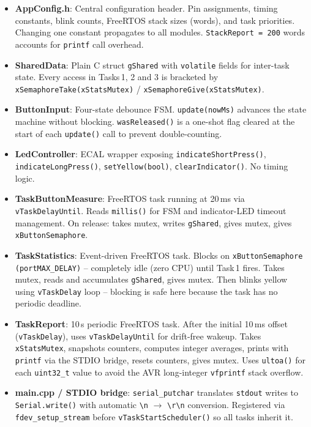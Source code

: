\documentclass[12pt]{article}
\begin{document}
\begin{itemize}
    \item \textbf{AppConfig.h}: Central configuration header. Pin assignments, timing constants, blink counts, FreeRTOS stack sizes (words), and task priorities. Changing one constant propagates to all modules. \texttt{StackReport = 200} words accounts for \texttt{printf} call overhead.

    \item \textbf{SharedData}: Plain C struct \texttt{gShared} with \texttt{volatile} fields for inter-task state. Every access in Tasks\,1, 2 and 3 is bracketed by \texttt{xSemaphoreTake(xStatsMutex)} / \texttt{xSemaphoreGive(xStatsMutex)}.

    \item \textbf{ButtonInput}: Four-state debounce FSM. \texttt{update(nowMs)} advances the state machine without blocking. \texttt{wasReleased()} is a one-shot flag cleared at the start of each \texttt{update()} call to prevent double-counting.

    \item \textbf{LedController}: ECAL wrapper exposing \texttt{indicateShortPress()}, \texttt{indicateLongPress()}, \texttt{setYellow(bool)}, \texttt{clearIndicator()}. No timing logic.

    \item \textbf{TaskButtonMeasure}: FreeRTOS task running at 20\,ms via \texttt{vTaskDelayUntil}. Reads \texttt{millis()} for FSM and indicator-LED timeout management. On release: takes mutex, writes \texttt{gShared}, gives mutex, gives \texttt{xButtonSemaphore}.

    \item \textbf{TaskStatistics}: Event-driven FreeRTOS task. Blocks on \texttt{xButtonSemaphore (portMAX\_DELAY)} -- completely idle (zero CPU) until Task\,1 fires. Takes mutex, reads and accumulates \texttt{gShared}, gives mutex. Then blinks yellow using \texttt{vTaskDelay} loop -- blocking is safe here because the task has no periodic deadline.

    \item \textbf{TaskReport}: 10\,s periodic FreeRTOS task. After the initial 10\,ms offset (\texttt{vTaskDelay}), uses \texttt{vTaskDelayUntil} for drift-free wakeup. Takes \texttt{xStatsMutex}, snapshots counters, computes integer averages, prints with \texttt{printf} via the STDIO bridge, resets counters, gives mutex. Uses \texttt{ultoa()} for each \texttt{uint32\_t} value to avoid the AVR long-integer \texttt{vfprintf} stack overflow.

    \item \textbf{main.cpp / STDIO bridge}: \texttt{serial\_putchar} translates \texttt{stdout} writes to \texttt{Serial.write()} with automatic \texttt{\textbackslash{}n} $\rightarrow$ \texttt{\textbackslash{}r\textbackslash{}n} conversion. Registered via \texttt{fdev\_setup\_stream} before \texttt{vTaskStartScheduler()} so all tasks inherit it.
\end{itemize}
\end{document}
